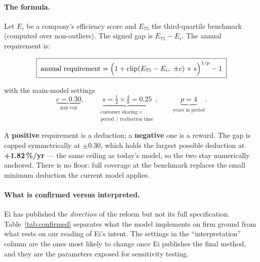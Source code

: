 \paragraph{The formula.}
Let $E_i$ be a company's efficiency score and $E_{75}$ the third-quartile
benchmark (computed over non-outliers). The signed gap is $E_{75}-E_i$. The annual
requirement is:

\begin{equation}
\boxed{\;
\text{annual requirement}
= \Bigl(1 + \operatorname{clip}\!\left(E_{75}-E_i,\ \pm c\right)\times s\Bigr)^{1/p} - 1
\;}
\end{equation}

with the main-model settings
\[
\underbrace{c = 0.30}_{\text{gap cap}}, \qquad
\underbrace{s = \tfrac{1}{2}\times\tfrac{4}{8} = 0.25}_{\substack{\text{customer sharing}\ \times\\ \text{period / realisation time}}}, \qquad
\underbrace{p = 4}_{\text{years in period}} .
\]

A \textbf{positive} requirement is a deduction; a \textbf{negative} one is a
reward. The gap is capped symmetrically at $\pm 0.30$, which holds the largest
possible deduction at \textbf{+1.82\,\%/yr} --- the same ceiling as today's model,
so the two stay numerically anchored. There is no floor: full coverage at the
benchmark replaces the small minimum deduction the current model applies.

\paragraph{What is confirmed versus interpreted.}
Ei has published the \emph{direction} of the reform but not its full
specification. Table~\ref{tab:confirmed} separates what the model implements on
firm ground from what rests on our reading of Ei's intent. The settings in the
``interpretation'' column are the ones most likely to change once Ei publishes the
final method, and they are the parameters exposed for sensitivity testing.

